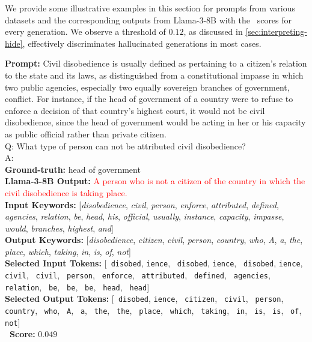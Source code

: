 We provide some illustrative examples in this section for prompts from various datasets and the corresponding outputs from Llama-3-8B with the \method~scores for every generation. We observe a threshold of $0.12$, as discussed in \cref{sec:interpreting-hide}, effectively discriminates hallucinated generations in most cases. 

\begin{tcolorbox}[breakable,title=Example from SQuAD, colback=gray!5!white, colframe=gray!70!black, boxrule=0.6pt, arc=2mm, left=2mm, right=2mm, top=1mm, bottom=1mm]
\footnotesize
\textbf{Prompt:} Civil disobedience is usually defined as pertaining to a citizen's relation to the state and its laws, as distinguished from a constitutional impasse in which two public agencies, especially two equally sovereign branches of government, conflict. For instance, if the head of government of a country were to refuse to enforce a decision of that country's highest court, it would not be civil disobedience, since the head of government would be acting in her or his capacity as public official rather than private citizen. \\Q: What type of person can not be attributed civil disobedience? \\A:\\[1ex]
\textbf{Ground-truth:} head of government\\
\textbf{Llama-3-8B Output:} \textcolor{red}{A person who is not a citizen of the country in which the civil disobedience is taking place.}\\

\textbf{Input Keywords:} [\textit{disobedience}, \textit{civil}, \textit{person}, \textit{enforce}, \textit{attributed}, \textit{defined}, \textit{agencies}, \textit{relation}, \textit{be}, \textit{head}, \textit{his}, \textit{official}, \textit{usually}, \textit{instance}, \textit{capacity}, \textit{impasse}, \textit{would}, \textit{branches}, \textit{highest}, \textit{and}]\\
\textbf{Output Keywords:} [\textit{disobedience}, \textit{citizen}, \textit{civil}, \textit{person}, \textit{country}, \textit{who}, \textit{A}, \textit{a}, \textit{the}, \textit{place}, \textit{which}, \textit{taking}, \textit{in}, \textit{is}, \textit{of}, \textit{not}]\\
\textbf{Selected Input Tokens:} [\texttt{ disobed}, \texttt{ience}, \texttt{ disobed}, \texttt{ience}, \texttt{ disobed}, \texttt{ience}, \texttt{ civil}, \texttt{ civil}, \texttt{ person}, \texttt{ enforce}, \texttt{ attributed}, \texttt{ defined}, \texttt{ agencies}, \texttt{ relation}, \texttt{ be}, \texttt{ be}, \texttt{ be}, \texttt{ head}, \texttt{ head}]\\
\textbf{Selected Output Tokens:} [\texttt{ disobed}, \texttt{ience}, \texttt{ citizen}, \texttt{ civil}, \texttt{ person}, \texttt{ country}, \texttt{ who}, \texttt{ A}, \texttt{ a}, \texttt{ the}, \texttt{ the}, \texttt{ place}, \texttt{ which}, \texttt{ taking}, \texttt{ in}, \texttt{ is}, \texttt{ is}, \texttt{ of}, \texttt{ not}]\\

\textbf{\method~Score:} $0.049$
\end{tcolorbox}

